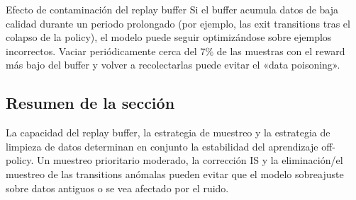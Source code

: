\begin{warningbox}{Efecto de contaminación del replay buffer}
Si el buffer acumula datos de baja calidad durante un periodo prolongado (por ejemplo, las exit transitions tras el colapso de la policy), el modelo puede seguir optimizándose sobre ejemplos incorrectos. Vaciar periódicamente cerca del 7\% de las muestras con el reward más bajo del buffer y volver a recolectarlas puede evitar el «data poisoning».
\end{warningbox}

\subsection{Resumen de la sección}

La capacidad del replay buffer, la estrategia de muestreo y la estrategia de limpieza de datos determinan en conjunto la estabilidad del aprendizaje off-policy. Un muestreo prioritario moderado, la corrección IS y la eliminación/el muestreo de las transitions anómalas pueden evitar que el modelo sobreajuste sobre datos antiguos o se vea afectado por el ruido.

